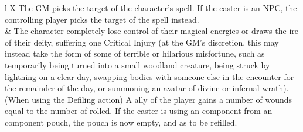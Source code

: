\begin{table*}[!htb]
\begin{GenesysTable}{l X}
                                        The GM picks the target of the character's spell. If the caster is an NPC, the controlling player picks the target of the spell instead.\\
\despair\despair                   &    The character completely lose control of their magical energies or draws the ire of their deity, suffering one Critical Injury (at the GM's
                                        discretion, this may instead take the form of some of terrible or hilarious misfortune, such as temporarily being turned into a small woodland
                                        creature, being struck by lightning on a clear day, swapping bodies with someone else in the encounter for the remainder of the day, or
                                        summoning an avatar of divine or infernal wrath).\newline
                                        \newline
                                        (When using the Defiling action) A ally of the player gains a number of wounds equal to the number of \threat rolled.
                                        \newline
                                        If the caster is using an component from an component pouch, the pouch is now empty, and as to be refilled.\\
\end{GenesysTable}
\end{table*}

